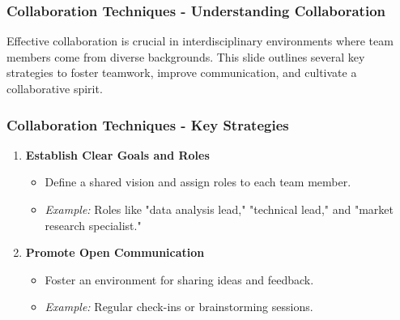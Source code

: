\documentclass{beamer}
\begin{document}
\begin{frame}[fragile]
    \frametitle{Collaboration Techniques - Understanding Collaboration}
    Effective collaboration is crucial in interdisciplinary environments where team members come from diverse backgrounds. 
    This slide outlines several key strategies to foster teamwork, improve communication, and cultivate a collaborative spirit.
\end{frame}

\begin{frame}[fragile]
    \frametitle{Collaboration Techniques - Key Strategies}
    \begin{enumerate}
        \item \textbf{Establish Clear Goals and Roles}
        \begin{itemize}
            \item Define a shared vision and assign roles to each team member.
            \item \textit{Example:} Roles like "data analysis lead," "technical lead," and "market research specialist."
        \end{itemize}

        \item \textbf{Promote Open Communication}
        \begin{itemize}
            \item Foster an environment for sharing ideas and feedback.
            \item \textit{Example:} Regular check-ins or brainstorming sessions.
        \end{itemize}
    \end{enumerate}
\end{frame}
\end{document}
